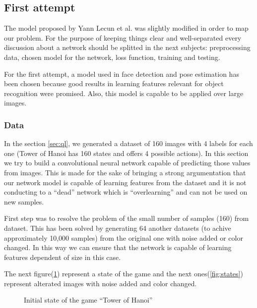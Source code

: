 \subsection{First attempt}
The model proposed by Yann Lecun et al.\cite{energy-based} was slightly modified in order to map our problem. For the purpose of keeping things clear and well-separated every discussion about a network should be splitted in the next subjects: preprocessing data, chosen model for the network, loss function, training and testing.

For the first attempt, a model used in face detection and pose estimation has been chosen because good results in learning features relevant for object recognition were promised. Also, this model is capable to be applied over large images.

\subsubsection{Data}

In the section \ref{sec:ql}, we generated a dataset of 160 images with 4 labels for each one (Tower of Hanoi has 160 states and offers 4 possible actions). In this section we try to build a convolutional neural network capable of predicting those values from images. This is made for the sake of bringing a strong argumentation that our network model is capable of learning features from the dataset and it is not conducting to a ``dead'' network which is ``overlearning'' and can not be used on new samples.

First step was to resolve the problem of the small number of samples (160) from dataset. This has been solved by generating 64 another datasets (to achive approximately 10,000 samples) from the original one with noise added or color changed. In this way we can ensure that the network is capable of learning features dependent of size in this case.

The next figure(\ref{fig:155}) represent a state of the game and the next ones(\ref{fig:states}) represent alterated images with noise added and color changed.

\begin{figure}[h]
	\begin{center}
		\caption{Initial state of the game ``Tower of Hanoi''} \label{fig:155}
    \end{center}
\end{figure}

